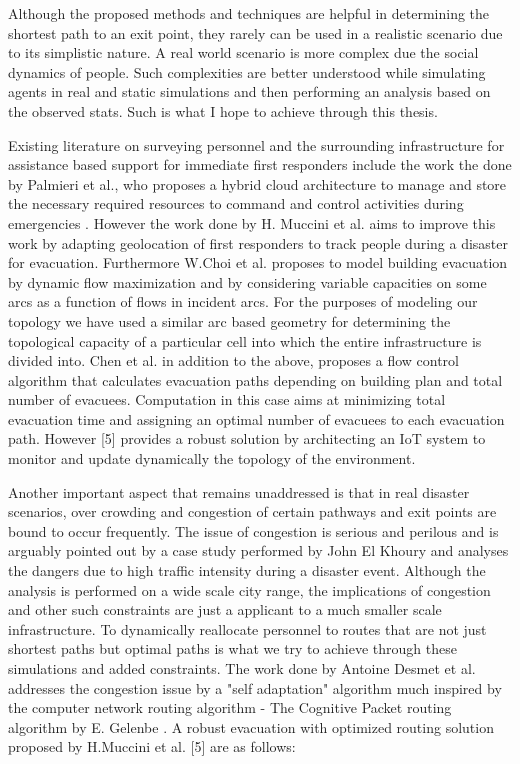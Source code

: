 Although the proposed methods and techniques are helpful in determining the shortest path to an exit point, they rarely can be used in a realistic scenario due to its simplistic nature. A real world scenario is more complex due the social dynamics of people. Such complexities are better understood while simulating agents in real and static simulations and then performing an analysis based on the observed stats. Such is what I hope to achieve through this thesis.

Existing literature on surveying personnel and the surrounding infrastructure for assistance based support for immediate first responders include the work the done by Palmieri et al., who proposes a hybrid cloud architecture to manage and store the necessary required resources to command and control activities during emergencies \cite{ref14}. However the work done by H. Muccini et al. \cite{ref5} aims to improve this work by adapting geolocation of first responders to track people during a disaster for evacuation. Furthermore W.Choi et al. \cite{ref15} proposes to model building evacuation by dynamic flow maximization and by considering variable capacities on some arcs as a function of flows in incident arcs. For the purposes of modeling our topology we have used a similar arc based geometry for determining the topological capacity of a particular cell into which the entire infrastructure is divided into. Chen et al. \cite{ref16} in addition to the above, proposes a flow control algorithm that calculates evacuation paths depending on building plan and total number of
evacuees. Computation in this case aims at minimizing total evacuation time and assigning an optimal number of evacuees to each evacuation path. However [5] provides a robust solution by architecting an IoT system to monitor and update dynamically the topology of the environment.

Another important aspect that remains unaddressed is that in real disaster scenarios, over crowding and congestion of certain pathways and exit points are bound to occur frequently. The issue of congestion is serious and perilous and is arguably pointed out by a case study performed by John El Khoury \cite{ref17} and analyses the dangers due to high traffic intensity during a disaster event. Although the analysis is performed on a wide scale city range, the implications of congestion and other such constraints are just a applicant to a much smaller scale infrastructure. To dynamically reallocate personnel to routes that are not just shortest paths but optimal paths is what we try to achieve through these simulations and added constraints. The work done by Antoine Desmet et al. \cite{ref18} addresses the congestion issue by a "self adaptation" algorithm much inspired by the computer network routing algorithm - The Cognitive Packet routing algorithm by E. Gelenbe \cite{ref19}. A robust evacuation with optimized routing solution proposed by H.Muccini et al. [5] are as follows:

